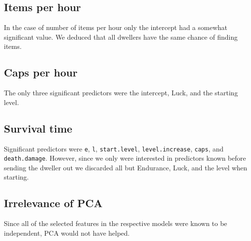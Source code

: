\subsection{Items per hour}
In the case of number of items per hour only the intercept had a somewhat significant value. We deduced that all dwellers have the same chance of finding items.

\subsection{Caps per hour}
The only three significant predictors were the intercept, Luck, and the starting level.

\subsection{Survival time}
Significant predictors were \texttt{e}, \texttt{l}, \texttt{start.level}, \texttt{level.increase}, \texttt{caps}, and \texttt{death.damage}. However, since we only were interested in predictors known before sending the dweller out we discarded all but Endurance, Luck, and the level when starting.

\subsection{Irrelevance of PCA}
Since all of the selected features in the respective models were known to be independent, PCA would not have helped.


